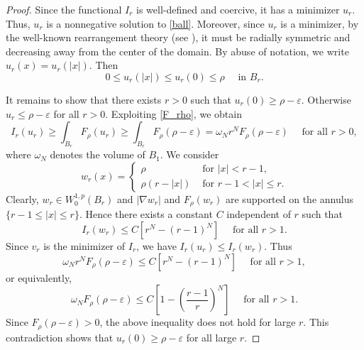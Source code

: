 \documentclass[reqno]{amsart}
\theoremstyle{plain}
\theoremstyle{definition}
\theoremstyle{remark}
\begin{document}
\begin{proof}
		Since the functional $I_r$ is well-defined and coercive, it has a minimizer $u_r$. Thus, $u_r$ is a nonnegative solution to \eqref{ball}. Moreover, since $u_r$ is a minimizer, by the well-known rearrangement theory (see \cite{MR810619}), it must be radially symmetric and decreasing away from the center of the domain. By abuse of notation, we write $u_r(x)=u_r(|x|)$. Then
		\[
		0 \le u_r(|x|) \le u_r(0) \le \rho \quad\text{ in } B_r.
		\]
		
		It remains to show that there exists $r>0$ such that $u_r(0) \ge \rho - \varepsilon$. Otherwise $u_r \le \rho - \varepsilon$ for all $r>0$. Exploiting \eqref{F_rho}, we obtain
		\[
		I_r(u_r) \ge \int_{B_r} F_\rho(u_r) \ge \int_{B_r} F_\rho(\rho-\varepsilon) = \omega_N r^N F_\rho(\rho-\varepsilon) \quad\text{ for all } r>0,
		\]
		where $\omega_N$ denotes the volume of $B_1$. We consider
		\[
		w_r(x) = 
		\begin{cases}
			\rho &\text{ for } |x|<r-1,\\
			\rho(r-|x|) &\text{ for } r-1<|x|\le r.
		\end{cases}
		\]
		Clearly, $w_r \in W^{1,p}_0(B_r)$ and $|\nabla w_r|$ and $F_\rho(w_r)$ are supported on the annulus $\{r-1 \le |x| \le r\}$. Hence there exists a constant $C$ independent of $r$ such that
		\[
		I_r(w_r) \le C\left[r^N - (r-1)^N\right] \quad\text{ for all } r>1.
		\]
		Since $v_r$ is the minimizer of $I_r$, we have $I_r(u_r) \le I_r(w_r)$. Thus
		\[
		\omega_N r^N F_\rho(\rho-\varepsilon) \le C\left[r^N - (r-1)^N\right] \quad\text{ for all } r>1,
		\]
		or equivalently,
		\[
		\omega_N F_\rho(\rho-\varepsilon) \le C\left[1 - \left(\frac{r-1}{r}\right)^N\right] \quad\text{ for all } r>1.
		\]
		Since $F_\rho(\rho-\varepsilon)>0$, the above inequality does not hold for large $r$. This contradiction shows that $u_r(0) \ge \rho-\varepsilon$ for all large $r$.
	\end{proof}
	
\end{document}
